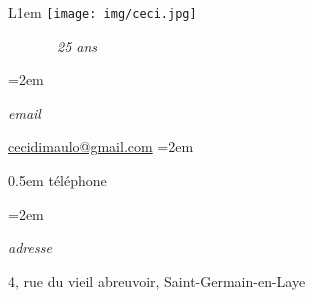 \documentclass[10pt,a4paper]{scrartcl}
\newlength{\datebox}\settowidth{\datebox}{10.2018-1.2018} %
\newcommand{\NewEntryL}[3]{\noindent\hangindent=2em\hangafter=0 \parbox{\datebox}{\normalsize \textit{#1}}\hspace{5em} #2 #3 %
\vspace{0.5em}} %
\newcommand{\Description}[1]{\hangindent=2em\hangafter=0\raggedright\footnotesize{#1}\par\normalsize\vspace{1em}} %
\begin{document}
\thispagestyle{empty} %


\begin{wrapfigure}{L}{1em}
 \hspace*{-10em}
 \texttt{[image: img/ceci.jpg]}
\end{wrapfigure}

\begin{cv}{ \ \ \ \ \ \ \  \large\emph{25 ans}}\vspace{2em} %


\NewEntryL{email}{\href{mailto:cecidimaulo@gmail.com}{cecidimaulo@gmail.com}} %

\NewEntryL{t\'{e}l\'{e}phone}{ +33 6 26 30 86 90} %

\NewEntryL{adresse}{ 4, rue du vieil abreuvoir, Saint-Germain-en-Laye} %

\vspace{1.2em} %




\vspace{1.5em} %


\end{cv}
\end{document}
